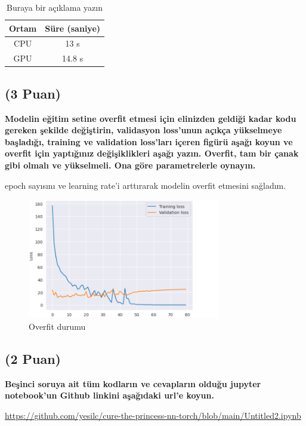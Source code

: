 \documentclass[11pt]{article}
\begin{document}
\begin{table}[ht!]
    \centering
    \caption{Buraya bir açıklama yazın}
    \begin{tabular}{c|c}
        Ortam & Süre (saniye) \\\hline
        CPU & 13 s \\
        GPU & 14.8 s\\
    \end{tabular}
    \label{tab:my_table}
\end{table}

\subsection{(3 Puan)} \textbf{Modelin eğitim setine overfit etmesi için elinizden geldiği kadar kodu gereken şekilde değiştirin, validasyon loss'unun açıkça yükselmeye başladığı, training ve validation loss'ları içeren figürü aşağı koyun ve overfit için yaptığınız değişiklikleri aşağı yazın. Overfit, tam bir çanak gibi olmalı ve yükselmeli. Ona göre parametrelerle oynayın.}

epoch sayısını ve learning rate'i arttırarak modelin overfit etmesini sağladım.


\begin{figure}[ht!]
    \centering
    \includegraphics[width=0.75\textwidth]{epoch2.png}
    \caption{Overfit durumu}
    \label{fig:my_pic}
\end{figure}


\subsection{(2 Puan)} \textbf{Beşinci soruya ait tüm kodların ve cevapların olduğu jupyter notebook'un Github linkini aşağıdaki url'e koyun.}

\url{https://github.com/yesilc/cure-the-princess-nn-torch/blob/main/Untitled2.ipynb}
\end{document}
